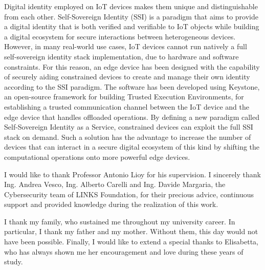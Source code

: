 \documentclass[pdfa%
,twoside%
,12pt%
]{toptesi}
\begin{document}
Digital identity employed on IoT devices makes them unique and distinguishable from each other. Self-Sovereign Identity (SSI) is a paradigm that aims to provide a digital identity that is both verified and verifiable to IoT objects while building a digital ecosystem for secure interactions between heterogeneous devices. However, in many real-world use cases, IoT devices cannot run natively a full self-sovereign identity stack implementation, due to hardware and software constraints. For this reason, an edge device has been designed with the capability of securely aiding constrained devices to create and manage their own identity according to the SSI paradigm. The software has been developed using Keystone, an open-source framework for building Trusted Execution Environments, for establishing a trusted communication channel between the IoT device and the edge device that handles offloaded operations. By defining a new paradigm called Self-Sovereign Identity as a Service, constrained devices can exploit the full SSI stack on demand. Such a solution has the advantage to increase the number of devices that can interact in a secure digital ecosystem of this kind by shifting the computational operations onto more powerful edge devices. 

\ringraziamenti

I would like to thank Professor Antonio Lioy for his supervision. I sincerely thank Ing. Andrea Vesco, Ing. Alberto Carelli and Ing. Davide Margaria, the Cybersecurity team of LINKS Foundation, for their precious advice, continuous support and provided knowledge during the realization of this work. 

I thank my family, who sustained me throughout my university career. In particular, I thank my father and my mother. Without them, this day would not have been possible. Finally, I would like to extend a special thanks to Elisabetta, who has always shown me her encouragement and love during these years of study.

\end{document}

